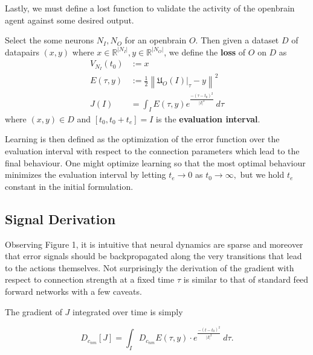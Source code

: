 Lastly, we must define a lost function to validate the activity of the openbrain agent against some desired output.
\begin{definition}
	Select the some neurons $N_I, N_O$ for an openbrain $O.$ Then given a dataset $D$ of datapairs $(x,y)$ where $x \in \mathbb{R}^{|N_I|}, y \in \mathbb{R}^{|N_O|}$, we define the \textbf{loss} of $O$ on $D$ as 
	\begin{equation}
		\begin{aligned}
			V_{N_I}(t_0) &:= x \\
			E(\tau, y) &:= \frac{1}{2}\left\|\mathfrak{U}_O(I)\big|_\tau - y\right \|^2 \\
			J(I) &=  \int_I E(\tau, y)e^{\frac{-(\tau - t_0)^2}{|I|^2}}\  d\tau
		\end{aligned}
	\end{equation}
	where $(x,y) \in D$ and $[t_0,t_0+t_e] = I$ is the \textbf{evaluation interval}.
\end{definition}

Learning is then defined as the optimization of the error function over the evaluation interval with respect to the connection parameters which lead to the final behaviour. One might optimize learning so that the most optimal behaviour minimizes the evaluation interval by letting $t_e \to 0$ as $t_0 \to \infty,$ but we hold $t_e$ constant in the initial formulation.

\subsection{Signal Derivation}

Observing Figure 1, it is intuitive that neural dynamics are sparse and moreover that error signals should be backpropagated along the very transitions that lead to the actions themselves. Not surprisingly the derivation of the gradient with respect to connection strength at a fixed time $\tau$ is similar to that of standard feed forward networks with a few caveats. 

The gradient of $J$ integrated over time is simply

\begin{equation}
D_{c_{nm}} [J] = \int_I D_{c_{nm}}E(\tau, y)\cdot e^{\frac{-(t-t_0)^2}{|I|^2}}\ d\tau.
\end{equation}

